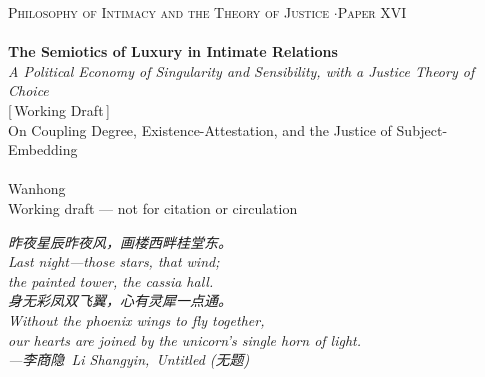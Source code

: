 \documentclass[11pt,a4paper]{article}
\newcommand{\zh}[1]{{\cjk #1}}
\begin{document}
\thispagestyle{empty}
\begin{center}
\vspace*{2cm}
{\footnotesize\color{rosedeep}\scshape Philosophy of Intimacy and the Theory of Justice \quad$\cdot$\quad Paper XVI}\\[0.3cm]
\coverrule\\[1.2cm]
{\LARGE\bfseries\color{warnred} The Semiotics of Luxury in Intimate Relations}\\[0.8cm]
{\large\itshape\color{warnred} A Political Economy of Singularity and Sensibility, with a Justice Theory of Choice}\\[0.8cm]
{\small\color{gold} [\,Working Draft\,]}\\[0.8cm]
{\normalsize\color{inksoft} On Coupling Degree, Existence-Attestation, and the Justice of Subject-Embedding}\\[2cm]
\coverrule[0.25]\\[0.6cm]
{\normalsize\color{inksoft} Wanhong}\\
\vfill
{\footnotesize\color{gold} Working draft --- not for citation or circulation}
\coverfootnote
\end{center}
\newpage

\thispagestyle{empty}
\vspace*{2.4cm}
\begin{center}
\begin{minipage}{0.74\linewidth}
\centering\itshape\color{rose}
{\cjk 昨夜星辰昨夜风，画楼西畔桂堂东。}\\[0.3em]
Last night---those stars, that wind;\\
the painted tower, the cassia hall.\\[0.8em]
{\cjk 身无彩凤双飞翼，心有灵犀一点通。}\\[0.3em]
Without the phoenix wings to fly together,\\
our hearts are joined by the unicorn's single horn of light.\\[0.6em]
{\upshape\footnotesize\color{gold} ---{\cjk 李商隐}\ Li Shangyin,\ \emph{Untitled} (\zh{无题})}
\end{minipage}
\end{center}
\newpage
\end{document}
